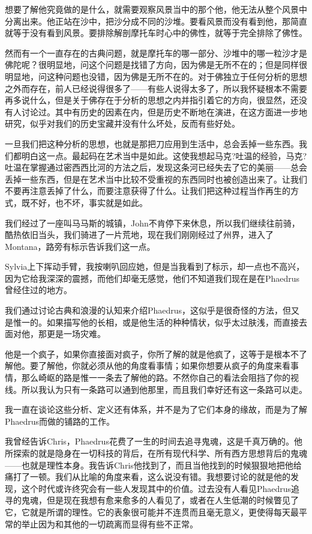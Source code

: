 \documentclass[UTF8]{article}
\begin{document}
\par 想要了解他究竟做的是什么，就需要观察风景当中的那个他，他无法从整个风景中分离出来。他正站在沙中，把沙分成不同的沙堆。要看风景而没有看到他，那简直就等于没有看到风景。要排除解剖摩托车时心中的佛性，就等于完全排除了佛性。
\par 然而有一个一直存在的古典问题，就是摩托车的哪一部分、沙堆中的哪一粒沙才是佛陀呢？很明显地，问这个问题是找错了方向，因为佛是无所不在的；但是同样很明显地，问这种问题也没错，因为佛是无所不在的。对于佛独立于任何分析的思想之外而存在，前人已经说得很多了——有些人说得太多了，所以我怀疑根本不需要再多说什么，但是关于佛存在于分析的思想之内并指引着它的方向，很显然，还没有人讨论过。其中有历史的因素在内，但是历史不断地在演进，在这方面进一步地研究，似乎对我们的历史宝藏并没有什么坏处，反而有些好处。
\par 一旦我们把这种分析的思想，也就是那把刀应用到生活中，总会丢掉一些东西。我们都明白这一点。最起码在艺术当中是如此。这使我想起马克?吐温的经验，马克?吐温在掌握通过密西西比河的方法之后，发现这条河已经失去了它的美丽——总会丢掉一些东西，但是在艺术当中比较不受重视的东西同时也被创造出来了。让我们不要再注意丢掉了什么，而要注意获得了什么。让我们把这种过程当作再生的方式，既不好，也不坏，事实就是如此。
\par 我们经过了一座叫马马斯的城镇，John不肯停下来休息，所以我们继续往前骑，酷热依旧当头，我们骑进了一片荒地，现在我们刚刚经过了州界，进入了Montana，路旁有标示告诉我们这一点。
\par Sylvia上下挥动手臂，我按喇叭回应她，但是当我看到了标示，却一点也不高兴，因为它给我深深的震撼，而他们却毫无感觉，他们不知道我们现在是在Phaedrus曾经住过的地方。
\par 我们通过讨论古典和浪漫的认知来介绍Phaedrus，这似乎是很奇怪的方法，但又是惟一的。如果描写他的长相，或是他生活的种种情状，似乎太过肤浅，而直接去面对他，那更是一场灾难。
\par 他是一个疯子，如果你直接面对疯子，你所了解的就是他疯了，这等于是根本不了解他。要了解他，你就必须从他的角度看事情；如果你想要从疯子的角度来看事情，那么崎岖的路是惟一一条去了解他的路。不然你自己的看法会阻挡了你的视线。所以我认为只有一条路可以通到他那里，而且我们幸好还有这一条路可以走。
\par 我一直在谈论这些分析、定义还有体系，并不是为了它们本身的缘故，而是为了解Phaedrus而做的铺路的工作。
\par 我曾经告诉Chris，Phaedrus花费了一生的时间去追寻鬼魂，这是千真万确的。他所探索的就是隐身在一切科技的背后，在所有现代科学、所有西方思想背后的鬼魂——也就是理性本身。我告诉Chris他找到了，而且当他找到的时候狠狠地把他给痛打了一顿。我们从比喻的角度来看，这么说没有错。我想要讨论的就是他的发现，这个时代或许终究会有一些人发现其中的价值。过去没有人看见Phaedrus追寻的鬼魂，但是现在我想有愈来愈多的人看见了，或者在人生低潮的时候瞥见了它，它就是所谓的理性。它的表象很可能并不连贯而且毫无意义，更使得每天最平常的举止因为和其他的一切疏离而显得有些不正常。
\end{document}

